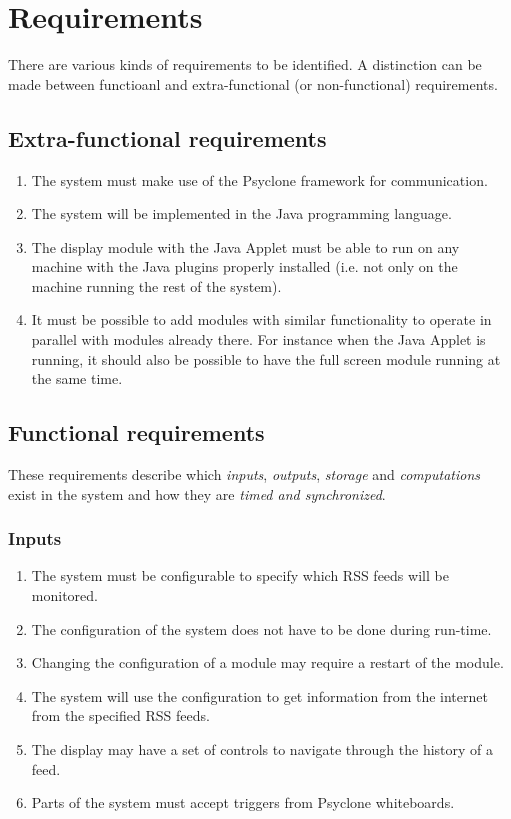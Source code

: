 \chapter{Requirements}

There are various kinds of requirements to be identified. A distinction can be
made between functioanl and extra-functional (or non-functional) requirements.

\section{Extra-functional requirements}

\begin{enumerate}
  \item The system must make use of the Psyclone framework for communication.
  \item The system will be implemented in the Java programming language.
  \item The display module with the Java Applet must be able to run on any
        machine with the Java plugins properly installed (i.e. not only on the
        machine running the rest of the system).
  \item It must be possible to add modules with similar functionality to
        operate in parallel with modules already there. For instance when the
        Java Applet is running, it should also be possible to have the full
        screen module running at the same time. 
\end{enumerate}

\section{Functional requirements}

These requirements describe which \emph{inputs}, \emph{outputs}, \emph{storage}
and \emph{computations} exist in the system and how they are \emph{timed and
synchronized}.

\subsection{Inputs}

\begin{enumerate}
  \item The system must be configurable to specify which RSS feeds will be
        monitored.
  \item The configuration of the system does not have to be done during run-time.
  \item Changing the configuration of a module may require a restart of the
        module.
  \item The system will use the configuration to get information from the
        internet from the specified RSS feeds.
  \item The display may have a set of controls to navigate through the history
        of a feed.
  \item Parts of the system must accept triggers from Psyclone whiteboards.
\end{enumerate}

